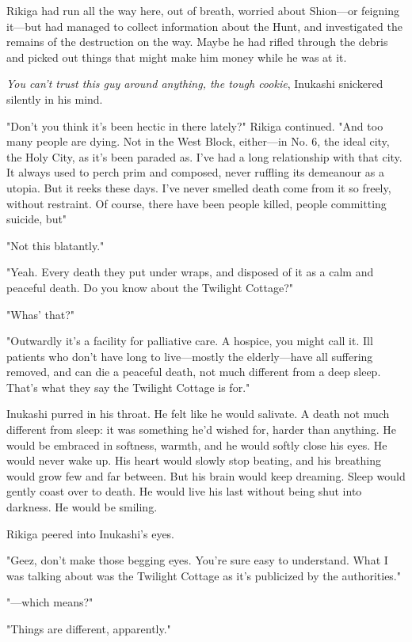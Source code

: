 Rikiga had run all the way here, out of breath, worried about Shion---or
feigning it---but had managed to collect information about the Hunt, and
investigated the remains of the destruction on the way. Maybe he had
rifled through the debris and picked out things that might make him
money while he was at it.

\emph{You can't trust this guy around anything, the tough cookie}, Inukashi
snickered silently in his mind.

"Don't you think it's been hectic in there lately?" Rikiga continued.
"And too many people are dying. Not in the West Block, either---in No. 6,
the ideal city, the Holy City, as it's been paraded as. I've had a long
relationship with that city. It always used to perch prim and composed,
never ruffling its demeanour as a utopia. But it reeks these days. I've
never smelled death come from it so freely, without restraint. Of
course, there have been people killed, people committing suicide,
but\el "

"Not this blatantly."

"Yeah. Every death they put under wraps, and disposed of it as a calm
and peaceful death. Do you know about the Twilight Cottage?"

"Whas' that?"

"Outwardly it's a facility for palliative care. A hospice, you might
call it. Ill patients who don't have long to live---mostly the
elderly---have all suffering removed, and can die a peaceful death, not
much different from a deep sleep. That's what they say the Twilight
Cottage is for."

Inukashi purred in his throat. He felt like he would salivate. A death
not much different from sleep: it was something he'd wished for, harder
than anything. He would be embraced in softness, warmth, and he would
softly close his eyes. He would never wake up. His heart would slowly
stop beating, and his breathing would grow few and far between. But his
brain would keep dreaming. Sleep would gently coast over to death. He
would live his last without being shut into darkness. He would be
smiling.

Rikiga peered into Inukashi's eyes.

"Geez, don't make those begging eyes. You're sure easy to understand.
What I was talking about was the Twilight Cottage as it's publicized by
the authorities."

"---which means?"

"Things are different, apparently."

